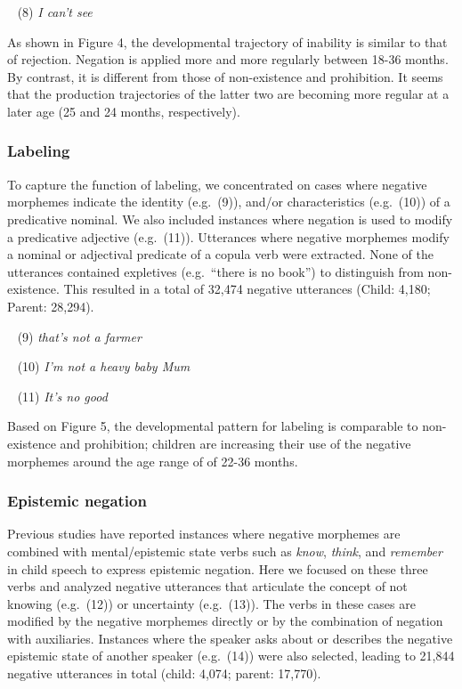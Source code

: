\documentclass[10pt, letterpaper]{article}
\begin{document}
~ (8) \emph{I can't see}

As shown in Figure 4, the developmental trajectory of inability is
similar to that of rejection. Negation is applied more and more
regularly between 18-36 months. By contrast, it is different from those
of non-existence and prohibition. It seems that the production
trajectories of the latter two are becoming more regular at a later age
(25 and 24 months, respectively).

\hypertarget{labeling}{%
\subsubsection{Labeling}\label{labeling}}

To capture the function of labeling, we concentrated on cases where
negative morphemes indicate the identity (e.g.~(9)), and/or
characteristics (e.g.~(10)) of a predicative nominal. We also included
instances where negation is used to modify a predicative adjective
(e.g.~(11)). Utterances where negative morphemes modify a nominal or
adjectival predicate of a copula verb were extracted. None of the
utterances contained expletives (e.g.~``there is no book'') to
distinguish from non-existence. This resulted in a total of 32,474
negative utterances (Child: 4,180; Parent: 28,294).

~ (9) \emph{that's not a farmer}

~ (10) \emph{I'm not a heavy baby Mum}

~ (11) \emph{It's no good}

Based on Figure 5, the developmental pattern for labeling is comparable
to non-existence and prohibition; children are increasing their use of
the negative morphemes around the age range of of 22-36 months.

\hypertarget{epistemic-negation}{%
\subsubsection{Epistemic negation}\label{epistemic-negation}}

Previous studies have reported instances where negative morphemes are
combined with mental/epistemic state verbs such as \emph{know},
\emph{think}, and \emph{remember} in child speech to express epistemic
negation. Here we focused on these three verbs and analyzed negative
utterances that articulate the concept of not knowing (e.g.~(12)) or
uncertainty (e.g.~(13)). The verbs in these cases are modified by the
negative morphemes directly or by the combination of negation with
auxiliaries. Instances where the speaker asks about or describes the
negative epistemic state of another speaker (e.g.~(14)) were also
selected, leading to 21,844 negative utterances in total (child: 4,074;
parent: 17,770).
\end{document}
